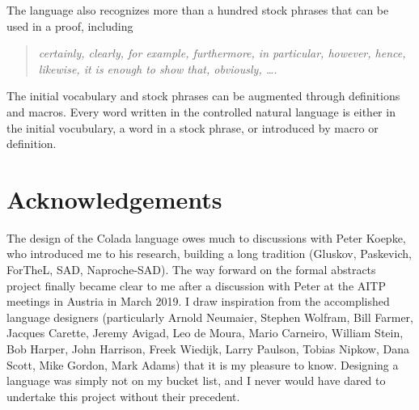 \documentclass[12pt]{article}
\numberwithin{definition}{section}
\begin{document}
The language also recognizes more than a hundred stock phrases that
can be used in a proof, including

\begin{quote}
{\it certainly, clearly, for example, furthermore, in particular, however,
hence, likewise, it is enough to show that, obviously, \ldots.}
\end{quote}

The initial vocabulary and stock phrases can be augmented through
definitions and macros.  Every word written in the controlled natural
language is either in the initial vocubulary, a word in a stock
phrase, or introduced by macro or definition.



\section{Acknowledgements}
The design of the Colada language owes much to discussions with Peter
Koepke, who introduced me to his research, building a long tradition
(Gluskov, Paskevich, ForTheL, SAD, Naproche-SAD).  The way forward on
the formal abstracts project finally became clear to me after a
discussion with Peter at the AITP meetings in Austria in March 2019. I
draw inspiration from the accomplished language designers
(particularly Arnold Neumaier, Stephen Wolfram, Bill Farmer, Jacques
Carette, Jeremy Avigad, Leo de Moura, Mario Carneiro, William Stein,
Bob Harper, John Harrison, Freek Wiedijk, Larry Paulson, Tobias
Nipkow, Dana Scott, Mike Gordon, Mark Adams) that it is my pleasure to
know.  Designing a language was simply not on my bucket list, and I
never would have dared to undertake this project without their
precedent.
\end{document}

